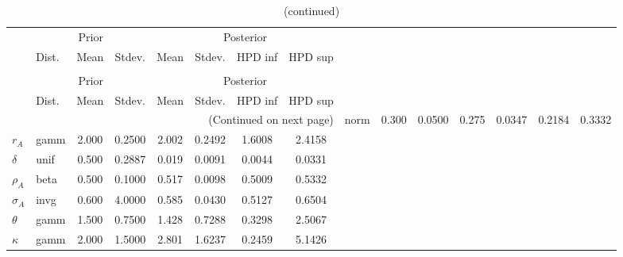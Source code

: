  
\begin{center}
\begin{longtable}{llcccccc} 
\caption{Results from Metropolis-Hastings (parameters)}
 \label{Table:MHPosterior:1}\\
\toprule 
  & \multicolumn{3}{c}{Prior}  &  \multicolumn{4}{c}{Posterior} \\
  \cmidrule(r{.75em}){2-4} \cmidrule(r{.75em}){5-8}
  & Dist. & Mean  & Stdev. & Mean & Stdev. & HPD inf & HPD sup\\
\midrule \endfirsthead 
\caption{(continued)}\\\toprule 
  & \multicolumn{3}{c}{Prior}  &  \multicolumn{4}{c}{Posterior} \\
  \cmidrule(r{.75em}){2-4} \cmidrule(r{.75em}){5-8}
  & Dist. & Mean  & Stdev. & Mean & Stdev. & HPD inf & HPD sup\\
\midrule \endhead 
\bottomrule \multicolumn{8}{r}{(Continued on next page)} \endfoot 
\bottomrule \endlastfoot 
${\alpha}$ & norm &   0.300 & 0.0500 &   0.275& 0.0347 &  0.2184 &  0.3332 \\ 
${r_{A}}$ & gamm &   2.000 & 0.2500 &   2.002& 0.2492 &  1.6008 &  2.4158 \\ 
${\delta}$ & unif &   0.500 & 0.2887 &   0.019& 0.0091 &  0.0044 &  0.0331 \\ 
${\rho_A}$ & beta &   0.500 & 0.1000 &   0.517& 0.0098 &  0.5009 &  0.5332 \\ 
${\sigma_A}$ & invg &   0.600 & 4.0000 &   0.585& 0.0430 &  0.5127 &  0.6504 \\ 
${\theta}$ & gamm &   1.500 & 0.7500 &   1.428& 0.7288 &  0.3298 &  2.5067 \\ 
${\kappa}$ & gamm &   2.000 & 1.5000 &   2.801& 1.6237 &  0.2459 &  5.1426 \\ 
\end{longtable}
 \end{center}
